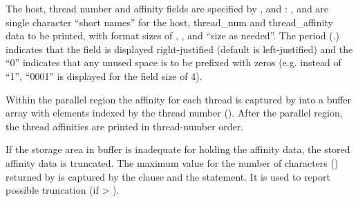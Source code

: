 The host, thread number and affinity fields are specified by , 
 and : ,  and  are single character ``short names''
for the host, thread\_num and thread\_affinity data to be printed,
with format sizes of , , and ``size as needed''.
The period (.) indicates that the field is displayed right-justified (default is left-justified) 
and the ``0'' indicates that any unused space is to be prefixed with zeros
(e.g. instead of ``1'', ``0001'' is displayed for the field size of 4).



Within the parallel region the affinity for each thread is captured by 
 into a buffer array with elements indexed 
by the thread number ().
After the parallel region, the thread affinities are printed in thread-number order.

If the storage area in buffer is inadequate for holding the affinity
data, the stored affinity data is truncated.  
The maximum value for the number of characters () returned by 
 is captured by the 
clause and the  statement. 
It is used to report possible truncation (if  > ).



